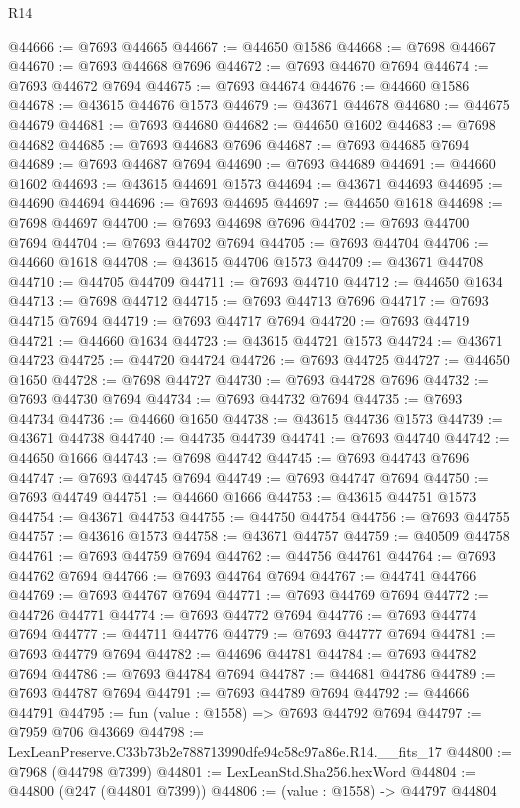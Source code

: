 \begin{lexlean}{R14}
\begin{coremodule}
@44666 := @7693 @44665
@44667 := @44650 @1586
@44668 := @7698 @44667
@44670 := @7693 @44668 @7696
@44672 := @7693 @44670 @7694
@44674 := @7693 @44672 @7694
@44675 := @7693 @44674
@44676 := @44660 @1586
@44678 := @43615 @44676 @1573
@44679 := @43671 @44678
@44680 := @44675 @44679
@44681 := @7693 @44680
@44682 := @44650 @1602
@44683 := @7698 @44682
@44685 := @7693 @44683 @7696
@44687 := @7693 @44685 @7694
@44689 := @7693 @44687 @7694
@44690 := @7693 @44689
@44691 := @44660 @1602
@44693 := @43615 @44691 @1573
@44694 := @43671 @44693
@44695 := @44690 @44694
@44696 := @7693 @44695
@44697 := @44650 @1618
@44698 := @7698 @44697
@44700 := @7693 @44698 @7696
@44702 := @7693 @44700 @7694
@44704 := @7693 @44702 @7694
@44705 := @7693 @44704
@44706 := @44660 @1618
@44708 := @43615 @44706 @1573
@44709 := @43671 @44708
@44710 := @44705 @44709
@44711 := @7693 @44710
@44712 := @44650 @1634
@44713 := @7698 @44712
@44715 := @7693 @44713 @7696
@44717 := @7693 @44715 @7694
@44719 := @7693 @44717 @7694
@44720 := @7693 @44719
@44721 := @44660 @1634
@44723 := @43615 @44721 @1573
@44724 := @43671 @44723
@44725 := @44720 @44724
@44726 := @7693 @44725
@44727 := @44650 @1650
@44728 := @7698 @44727
@44730 := @7693 @44728 @7696
@44732 := @7693 @44730 @7694
@44734 := @7693 @44732 @7694
@44735 := @7693 @44734
@44736 := @44660 @1650
@44738 := @43615 @44736 @1573
@44739 := @43671 @44738
@44740 := @44735 @44739
@44741 := @7693 @44740
@44742 := @44650 @1666
@44743 := @7698 @44742
@44745 := @7693 @44743 @7696
@44747 := @7693 @44745 @7694
@44749 := @7693 @44747 @7694
@44750 := @7693 @44749
@44751 := @44660 @1666
@44753 := @43615 @44751 @1573
@44754 := @43671 @44753
@44755 := @44750 @44754
@44756 := @7693 @44755
@44757 := @43616 @1573
@44758 := @43671 @44757
@44759 := @40509 @44758
@44761 := @7693 @44759 @7694
@44762 := @44756 @44761
@44764 := @7693 @44762 @7694
@44766 := @7693 @44764 @7694
@44767 := @44741 @44766
@44769 := @7693 @44767 @7694
@44771 := @7693 @44769 @7694
@44772 := @44726 @44771
@44774 := @7693 @44772 @7694
@44776 := @7693 @44774 @7694
@44777 := @44711 @44776
@44779 := @7693 @44777 @7694
@44781 := @7693 @44779 @7694
@44782 := @44696 @44781
@44784 := @7693 @44782 @7694
@44786 := @7693 @44784 @7694
@44787 := @44681 @44786
@44789 := @7693 @44787 @7694
@44791 := @7693 @44789 @7694
@44792 := @44666 @44791
@44795 := fun (value : @1558) => @7693 @44792 @7694
@44797 := @7959 @706 @43669
@44798 := LexLeanPreserve.C33b73b2e788713990dfe94c58c97a86e.R14.__fits_17
@44800 := @7968 (@44798 @7399)
@44801 := LexLeanStd.Sha256.hexWord
@44804 := @44800 (@247 (@44801 @7399))
@44806 := (value : @1558) -> @44797 @44804

\end{coremodule}
\end{lexlean}
